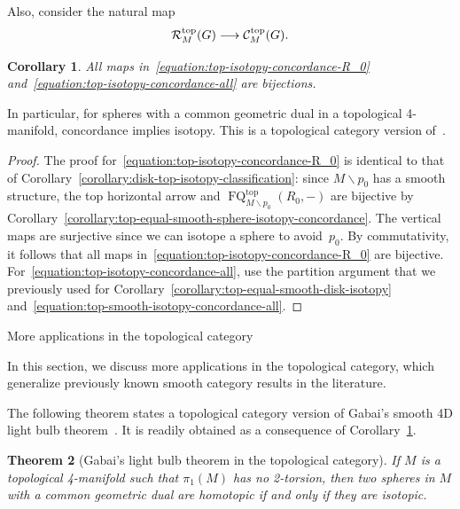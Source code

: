 \documentclass[11pt]{amsart}
\makeatletter
\def\section{\@startsection{section}{1}%
  \z@{-1.4\linespacing\@plus-.5\linespacing}{.8\linespacing}%
  {\normalfont\bfseries\Large\raggedright}}
\def\to{\mathchoice{\longrightarrow}{\rightarrow}{\rightarrow}{\rightarrow}}
\newtheorem{theorem}{Theorem}[section]
\newtheorem{corollary}[theorem]{Corollary}
\theoremstyle{definition}
\theoremstyle{theorem-giventitle}
\theoremstyle{definition-giventitle}
\numberwithin{equation}{section}
\def\cC{\mathcal{C}}
\def\cR{\mathcal{R}}
\def\top{\mathrm{top}}
\def\FQ{\operatorname{FQ}}
\def\setminus{\smallsetminus}
\makeatother
\begin{document}
Also, consider the natural map
\begin{equation}
  \cR^\top_M(G) \to \cC^\top_M(G).
  \label{equation:top-isotopy-concordance-all}
\end{equation}

\begin{corollary}
  \label{corollary:sphere-in-top-4-manifold-isotopy-concordance}
  All maps in~\eqref{equation:top-isotopy-concordance-R_0} and~\eqref{equation:top-isotopy-concordance-all} are bijections.
\end{corollary}

In particular, for spheres with a common geometric dual in a topological 4-manifold, concordance implies isotopy.
This is a topological category version of~\cite[Corollary~1.4]{Schneiderman-Teichner:2022-1}.

\begin{proof}
  The proof for~\eqref{equation:top-isotopy-concordance-R_0} is identical to that of Corollary~\ref{corollary:disk-top-isotopy-classification}:
  since $M\setminus p_0$ has a smooth structure, the top horizontal arrow and $\FQ^\top_{M\setminus p_0}(R_0,-)$ are bijective by Corollary~\ref{corollary:top-equal-smooth-sphere-isotopy-concordance}.
  The vertical maps are surjective since we can isotope a sphere to avoid~$p_0$.
  By commutativity, it follows that all maps in~\eqref{equation:top-isotopy-concordance-R_0} are bijective.
  For~\eqref{equation:top-isotopy-concordance-all}, use the partition argument that we previously used for Corollary~\ref{corollary:top-equal-smooth-disk-isotopy} and~\eqref{equation:top-smooth-isotopy-concordance-all}.
\end{proof}



\section{More applications in the topological category}
\label{section:more-applications}


In this section, we discuss more applications in the topological category, which generalize previously known smooth category results in the literature.

The following theorem states a topological category version of Gabai's smooth 4D light bulb theorem~\cite{Gabai:2020-1}.
It is readily obtained as a consequence of Corollary~\ref{corollary:sphere-in-top-4-manifold-isotopy-concordance}.

\begin{theorem}[Gabai's light bulb theorem in the topological category]
  \label{theorem:top-light-bulb-theorem}
  If $M$ is a topological 4-manifold such that $\pi_{1}(M)$ has no 2-torsion, then two spheres in $M$ with a common geometric dual are homotopic if and only if they are isotopic.
\end{theorem}
\end{document}
